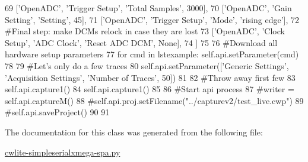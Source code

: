\begin{DoxyCode}
69                       [\textcolor{stringliteral}{'OpenADC'}, \textcolor{stringliteral}{'Trigger Setup'}, \textcolor{stringliteral}{'Total Samples'}, 3000],
70                       [\textcolor{stringliteral}{'OpenADC'}, \textcolor{stringliteral}{'Gain Setting'}, \textcolor{stringliteral}{'Setting'}, 45],
71                       [\textcolor{stringliteral}{'OpenADC'}, \textcolor{stringliteral}{'Trigger Setup'}, \textcolor{stringliteral}{'Mode'}, \textcolor{stringliteral}{'rising edge'}],
72                       \textcolor{comment}{#Final step: make DCMs relock in case they are lost}
73                       [\textcolor{stringliteral}{'OpenADC'}, \textcolor{stringliteral}{'Clock Setup'}, \textcolor{stringliteral}{'ADC Clock'}, \textcolor{stringliteral}{'Reset ADC DCM'}, \textcolor{keywordtype}{None}],
74                       ]
75         
76         \textcolor{comment}{#Download all hardware setup parameters}
77         \textcolor{keywordflow}{for} cmd \textcolor{keywordflow}{in} lstexample: self.api.setParameter(cmd)
78         
79         \textcolor{comment}{#Let's only do a few traces}
80         self.api.setParameter([\textcolor{stringliteral}{'Generic Settings'}, \textcolor{stringliteral}{'Acquisition Settings'}, \textcolor{stringliteral}{'Number of Traces'}, 50])
81                       
82         \textcolor{comment}{#Throw away first few}
83         self.api.capture1()
84         self.api.capture1()
85 
86         \textcolor{comment}{#Start api process}
87         \textcolor{comment}{#writer = self.api.captureM()}
88         \textcolor{comment}{#self.api.proj.setFilename("../capturev2/test\_live.cwp")}
89         \textcolor{comment}{#self.api.saveProject()}
90 
91 
\end{DoxyCode}


The documentation for this class was generated from the following file\+:\begin{DoxyCompactItemize}
\item 
\hyperlink{cwlite-simpleserialxmega-spa_8py}{cwlite-\/simpleserialxmega-\/spa.\+py}\end{DoxyCompactItemize}
